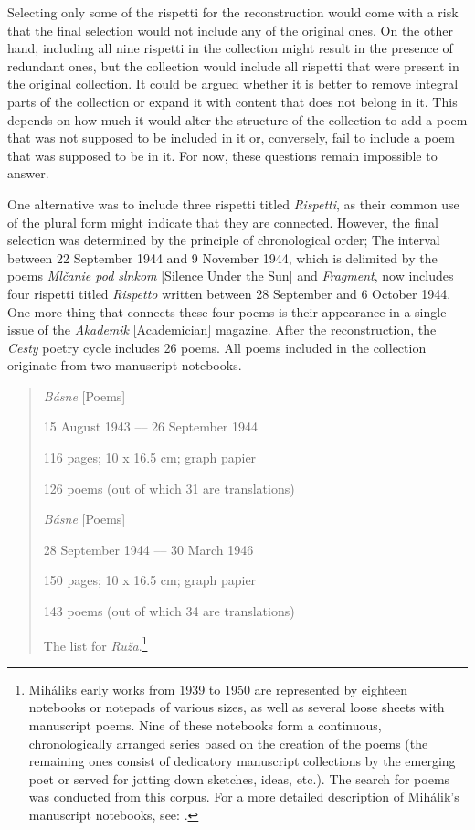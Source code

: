 \documentclass{article}
\begin{document}
Selecting only some of the rispetti for the reconstruction would come
with a risk that the final selection would not include any of the
original ones. On the other hand, including all nine rispetti in the
collection might result in the presence of redundant ones, but the
collection would include all rispetti that were present in the original
collection. It could be argued whether it is better to remove integral
parts of the collection or expand it with content that does not belong
in it. This depends on how much it would alter the structure of the
collection to add a poem that was not supposed to be included in it or,
conversely, fail to include a poem that was supposed to be in it. For
now, these questions remain impossible to answer.

One alternative was to include three rispetti titled \emph{Rispetti}, as
their common use of the plural form might indicate that they are
connected. However, the final selection was determined by the principle
of chronological order; The interval between 22 September 1944 and
9 November 1944, which is delimited by the poems \emph{Mlčanie pod
slnkom} [Silence Under the Sun] and \emph{Fragment}, now includes four
rispetti titled \emph{Rispetto} written between 28 September and
6 October 1944. One more thing that connects these four poems is their
appearance in a single issue of the \emph{Akademik} [Academician] magazine. After the reconstruction, the \emph{Cesty} poetry cycle
includes 26 poems. All poems included in the collection originate from
two manuscript notebooks.

\begin{quote}
\emph{Básne} [Poems]

15 August 1943 –– 26 September 1944

116 pages; 10 x 16.5 cm; graph papier

126 poems (out of which 31 are translations)

\hfill

\emph{Básne} [Poems]

28 September 1944 –– 30 March 1946

150 pages; 10 x 16.5 cm; graph papier

143 poems (out of which 34 are translations)

The list for \emph{Ruža}.\footnote{Mihálik\textquotesingle s early works
  from 1939 to 1950 are represented by eighteen notebooks or notepads of
  various sizes, as well as several loose sheets with manuscript poems.
  Nine of these notebooks form a continuous, chronologically arranged
  series based on the creation of the poems (the remaining ones consist
  of dedicatory manuscript collections by the emerging poet or served
  for jotting down sketches, ideas, etc.). The search for poems was
  conducted from this corpus. For a more detailed description of
  Mihálik's manuscript notebooks, see: \cite[17--21]{navratil_pramene_2019}.}
\end{quote}
\end{document}
